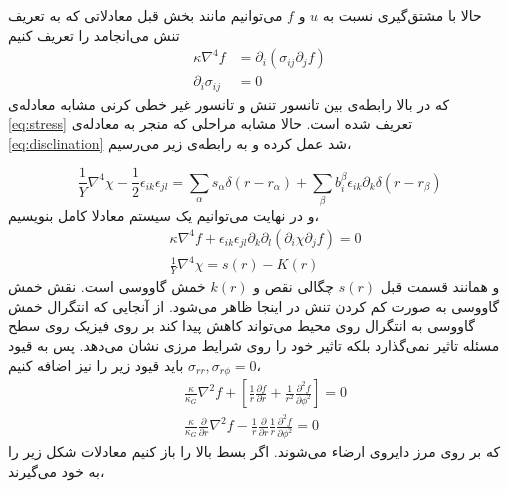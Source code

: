 حالا با مشتق‌گیری نسبت به $u$ و $f$
می‌توانیم مانند بخش قبل معادلاتی که به تعریف تنش می‌انجامد را تعریف کنیم
\begin{equation}
\begin{aligned}
\kappa\nabla^4f&=\partial_i(\sigma_{ij}\partial_jf)\\
\partial_i\sigma_{ij}&=0
\end{aligned}
\end{equation}
که در بالا رابطه‌ی بین تانسور تنش و تانسور غیر خطی کرنی مشابه معادله‌ی 
\ref{eq:stress}
تعریف شده است. حالا مشابه مراحلی که منجر به معادله‌ی 
\ref{eq:disclination}
شد عمل کرده و به رابطه‌ی زیر می‌رسیم،

\begin{equation}
\frac{1}{Y}\nabla^4\chi-\frac{1}{2}\epsilon_{ik}\epsilon_{jl}=\sum_\alpha s_\alpha\delta(r-r_\alpha)+\sum_\beta b_i^\beta\epsilon_{ik}\partial_k\delta(r-r_\beta)
\end{equation}
و در نهایت می‌توانیم یک سیستم معادلا کامل بنویسیم،
\begin{equation}
\begin{aligned}
&\kappa\nabla^4f+\epsilon_{ik}\epsilon_{jl}\partial_k\partial_l(\partial_i\chi\partial_jf)=0\\
&\frac{1}{Y}\nabla^4\chi=s(r)-K(r)
\end{aligned}
\end{equation}
و همانند قسمت قبل $s(r)$ چگالی نقص و 
$k(r)$
خمش گاووسی است. نقش خمش گاووسی به صورت کم کردن تنش در اینجا ظاهر می‌شود. از آنجایی که انتگرال خمش گاووسی به انتگرال روی محیط می‌تواند کاهش پیدا کند بر روی فیزیک روی سطح مسئله تاثیر نمی‌گذارد بلکه تاثیر خود را روی شرایط مرزی نشان می‌دهد. پس به قیود 
$\sigma_{rr},\sigma_{r\phi}=0$
باید قیود زیر را نیز اضافه کنیم،
\begin{equation}
\begin{aligned}
&\frac{\kappa}{\kappa_G}\nabla^2f+\left[\frac{1}{r}\frac{\partial f}{\partial r}+\frac{1}{r^2}\frac{\partial^2 f}{\partial\phi^2}\right]=0\\
&\frac{\kappa}{\kappa_G}\frac{\partial}{\partial r}\nabla^2f-\frac{1}{r}\frac{\partial}{\partial r}\frac{1}{r}\frac{\partial^2 f}{\partial\phi^2}=0
\end{aligned}
\end{equation}
که بر روی مرز دایروی ارضاء می‌شوند. اگر بسط بالا را باز کنیم معادلات شکل زیر را به خود می‌گیرند،

